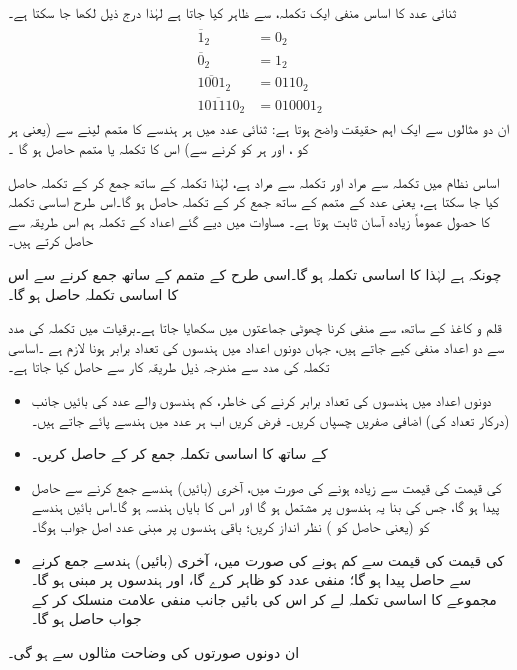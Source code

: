  ثنائی عدد     کا اساس منفی ایک  تکملہ،      سے ظاہر کیا جاتا ہے لہٰذا  درج ذیل لکھا جا سکتا ہے۔
\begin{gather}
\begin{aligned}
\overline{1}_2&=0_2\\
\overline{0}_2&=1_2\\
\overline{1001}_2&=0110_2\\
\overline{101110}_2&=010001_2
\end{aligned}
\end{gather}
ان دو مثالوں سے ایک اہم  حقیقت   واضح ہوتا ہے: ثنائی عدد  میں ہر ہندسے کا متمم لینے سے (یعنی  ہر   کو ،  اور ہر   کو  کرنے سے)  اس کا تکملہ  یا متمم  حاصل ہو گا ۔


  اساس  نظام میں  تکملہ  سے مراد    اور تکملہ    سے مراد  ہے،  لہٰذا تکملہ  کے ساتھ  جمع کر کے  تکملہ حاصل کیا جا سکتا ہے، یعنی عدد کے متمم کے ساتھ    جمع کر کے تکملہ  حاصل ہو گا۔اس طرح اساسی تکملہ کا حصول عموماً   زیادہ آسان ثابت ہوتا ہے۔  مساوات  میں دیے گئے   اعداد کے  تکملہ    ہم اس طریقہ سے حاصل کرتے ہیں۔
  
چونکہ  ہے    لہٰذا    کا اساسی تکملہ   ہو گا۔اسی طرح    کے متمم    کے ساتھ  جمع کرنے سے اس    کا اساسی تکملہ  حاصل  ہو گا۔

قلم و کاغذ  کے ساتھ،   سے   منفی کرنا چھوٹی جماعتوں میں سکھایا جاتا ہے۔برقیات  میں تکملہ کی مدد سے دو اعداد منفی کیے جاتے ہیں، جہاں دونوں اعداد میں ہندسوں کی تعداد برابر ہونا لازم ہے ۔اساسی تکملہ  کی مدد سے     مندرجہ ذیل طریقہ کار سے حاصل کیا جاتا ہے۔
\begin{itemize}
    \item
     دونوں  اعداد میں ہندسوں کی تعداد   برابر  کرنے کی خاطر،  کم ہندسوں  والے   عدد کی بائیں جانب  (درکار تعداد کی) اضافی صفریں  چسپاں کریں۔ فرض کریں اب ہر عدد میں     ہندسے پائے جاتے ہیں۔ 
    \item
     کے ساتھ    کا اساسی تکملہ جمع کر کے       حاصل کریں۔
   \item
        کی قیمت    کی قیمت سے زیادہ ہونے کی صورت میں، آخری  (بائیں)  ہندسے جمع کرنے سے  حاصل   پیدا ہو  گا،  جس کی بنا  یہ    ہندسوں پر مشتمل  ہو گا اور اس کا  بایاں ہندسہ         ہو گا۔اس  بائیں ہندسے    کو (یعنی حاصل  کو )  نظر انداز کریں؛ باقی    ہندسوں پر مبنی عدد اصل جواب ہوگا۔
    \item
{}کی قیمت   کی قیمت سے کم  ہونے کی صورت میں،  آخری  (بائیں)  ہندسے جمع کرنے سے  حاصل   پیدا    ہو  گا؛        منفی عدد کو ظاہر کرے گا، اور  ہندسوں  پر مبنی ہو گا۔مجموعے کا اساسی تکملہ لے کر اس کی بائیں جانب  منفی علامت  منسلک  کر کے  جواب  حاصل ہو گا۔
\end{itemize}
ان  دونوں صورتوں کی وضاحت مثالوں  سے ہو  گی۔ 

